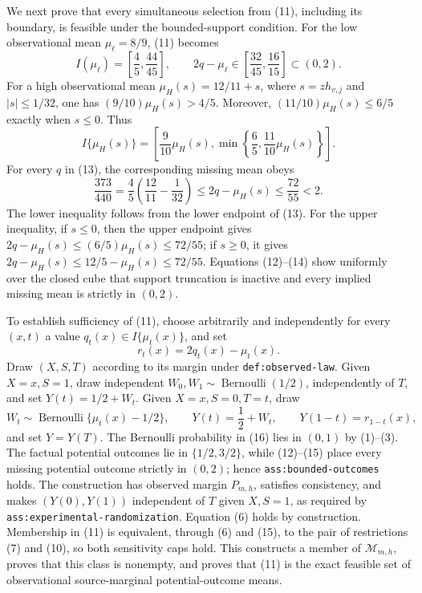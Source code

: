 We next prove that every simultaneous selection from (11), including
its boundary, is feasible under the bounded-support condition.  For the
low observational mean \(\mu_{\ell}=8/9\), (11) becomes
\[
 I(\mu_{\ell})=\left[\frac45,\frac{44}{45}\right],
 \qquad
 2q-\mu_{\ell}\in
 \left[\frac{32}{45},\frac{16}{15}\right]\subset(0,2).
 \tag{12}
\]
For a high observational mean
\(\mu_H(s)=12/11+s\), where \(s=z h_{v,j}\) and
\(|s|\leq1/32\), one has
\((9/10)\mu_H(s)>4/5\).  Moreover,
\((11/10)\mu_H(s)\leq6/5\) exactly when \(s\leq0\).
Thus
\[
 I\{\mu_H(s)\}
 =\left[
    \frac9{10}\mu_H(s),
    \min\left\{\frac65,\frac{11}{10}\mu_H(s)\right\}
   \right].
 \tag{13}
\]
For every \(q\) in (13), the corresponding missing mean obeys
\[
 \frac{373}{440}
 =\frac45\left(\frac{12}{11}-\frac1{32}\right)
 \leq 2q-\mu_H(s)\leq\frac{72}{55}<2.
 \tag{14}
\]
The lower inequality follows from the lower endpoint of (13).  For the
upper inequality, if \(s\leq0\), then the upper endpoint gives
\(2q-\mu_H(s)\leq(6/5)\mu_H(s)\leq72/55\); if
\(s\geq0\), it gives
\(2q-\mu_H(s)\leq12/5-\mu_H(s)\leq72/55\).
Equations (12)--(14) show uniformly over the closed cube that support
truncation is inactive and every implied missing mean is strictly in
\((0,2)\).

To establish sufficiency of (11), choose arbitrarily and independently
for every \((x,t)\) a value \(q_t(x)\in I\{\mu_t(x)\}\), and set
\[
 r_t(x)=2q_t(x)-\mu_t(x).
 \tag{15}
\]
Draw \((X,S,T)\) according to its margin under
\texttt{def:observed-law}.  Given \(X=x,S=1\), draw independent
\(W_0,W_1\sim\operatorname{Bernoulli}(1/2)\), independently of
\(T\), and set \(Y(t)=1/2+W_t\).  Given
\(X=x,S=0,T=t\), draw
\[
 W_t\sim\operatorname{Bernoulli}\{\mu_t(x)-1/2\},
 \qquad
 Y(t)=\frac12+W_t,
 \qquad
 Y(1-t)=r_{1-t}(x),
 \tag{16}
\]
and set \(Y=Y(T)\).  The Bernoulli probability in (16) lies in
\((0,1)\) by (1)--(3).  The factual potential outcomes lie in
\(\{1/2,3/2\}\), while (12)--(15) place every missing potential
outcome strictly in \((0,2)\); hence
\texttt{ass:bounded-outcomes} holds.  The construction has observed
margin \(P_{m,h}\), satisfies consistency, and makes
\((Y(0),Y(1))\) independent of \(T\) given \(X,S=1\), as required
by \texttt{ass:experimental-randomization}.  Equation (6) holds by
construction.  Membership in (11) is equivalent, through (6) and
(15), to the pair of restrictions (7) and (10), so both sensitivity
caps hold.  This constructs a member of \(\mathcal M_{m,h}\), proves
that this class is nonempty, and proves that (11) is the exact feasible
set of observational source-marginal potential-outcome means.


